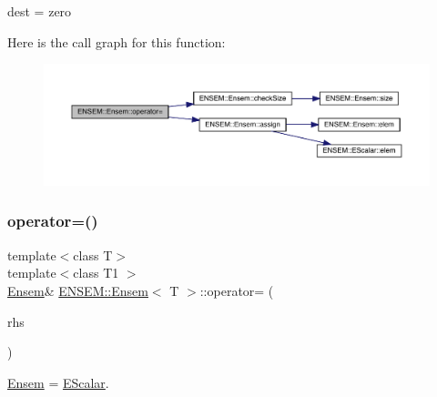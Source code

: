 dest = zero 

Here is the call graph for this function\+:
\nopagebreak
\begin{figure}[H]
\begin{center}
\leavevmode
\includegraphics[width=350pt]{d7/d3e/classENSEM_1_1Ensem_a55913bc59bca1022f5189cbc86632c11_cgraph}
\end{center}
\end{figure}
\mbox{\label{classENSEM_1_1Ensem_a376ab0239198595a09384c13d7a1ad1c}} 
\subsubsection{\texorpdfstring{operator=()}{operator=()}\hspace{0.1cm}{\footnotesize\ttfamily [5/10]}}
{\footnotesize\ttfamily template$<$class T$>$ \\
template$<$class T1 $>$ \\
\mbox{\hyperlink{classENSEM_1_1Ensem}{Ensem}}\& \mbox{\hyperlink{classENSEM_1_1Ensem}{E\+N\+S\+E\+M\+::\+Ensem}}$<$ T $>$\+::operator= (\begin{DoxyParamCaption}\item[{const \mbox{\hyperlink{classENSEM_1_1EScalar}{E\+Scalar}}$<$ T1 $>$ \&}]{rhs }\end{DoxyParamCaption})\hspace{0.3cm}{\ttfamily [inline]}}



\mbox{\hyperlink{classENSEM_1_1Ensem}{Ensem}} = \mbox{\hyperlink{classENSEM_1_1EScalar}{E\+Scalar}}. 

